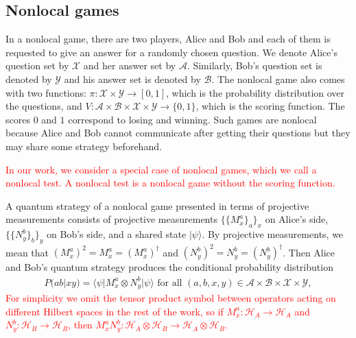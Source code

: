 \documentclass[11pt,letterpaper]{article}
\newcommand{\ket}[1]{|#1\rangle}
\newcommand{\bra}[1]{\langle#1|}
\newcommand{\x}{\otimes}
\newcommand{\calH}{\mathcal{H}}
\newcommand{\calX}{\mathcal{X}}
\newcommand{\calY}{\mathcal{Y}}
\newcommand{\calA}{\mathcal{A}}
\newcommand{\calB}{\mathcal{B}}
\newcommand{\1}{\mathbb{1}}
\newcommand{\pr}[2]{P(#1|#2)}
\newcommand{\hf}[1]{\textcolor{red}{#1}}
\theoremstyle{definition}
\begin{document}
\subsection{Nonlocal games}
In a nonlocal game, there are two players, Alice and Bob and each of them is requested
to give an answer for a randomly chosen question. We denote Alice's question set by $\calX$ and her answer set by $\calA$. Similarly,
Bob's question set is denoted by $\calY$ and his answer set is denoted by $\calB$. The nonlocal game also
comes with two functions: $\pi: \calX \times \calY \rightarrow [0,1]$, which is the probability distribution over the questions,
and $V: \calA \times \calB \times \calX \times \calY \rightarrow \{0,1\}$, which is the scoring function. 
The scores $0$ and $1$ correspond to losing and winning. 
Such games are nonlocal
because Alice and Bob cannot communicate after getting their questions but they may share some strategy beforehand. 

\hf{In our work, we consider a special case of nonlocal games, which we call a nonlocal test.
A nonlocal test is a nonlocal game without the scoring function.
}

A quantum strategy of a nonlocal game presented in terms of projective measurements
consists of projective measurements $\{\{M_x^a\}_a\}_x$ on Alice's side, 
$\{\{N_y^b\}_b\}_y$ on Bob's side, and a shared state $\ket{\psi}$. 
By projective measurements, we mean that  
$(M_x^a)^2 = M_x^a = (M_x^a)^\dagger$ and $(N_y^b)^2 = N_y^b = (N_y^b)^\dagger$.
Then Alice and Bob's quantum strategy produces the conditional probability distribution
\begin{align}
	\pr{ab}{xy} = \bra{\psi} M_x^a \x N_y^b \ket{\psi} \text{ for all } (a,b,x,y) \in \calA \times \calB \times \calX \times \calY,
\end{align}
\hf{For simplicity we omit the tensor product symbol between operators acting on different Hilbert spaces in the rest of the work, so if $M_x^a : \calH_A \rightarrow \calH_A$ and $N_y^b: 
\calH_B \rightarrow \calH_B$, then $M_x^a N_y^b: \calH_A\x \calH_B \rightarrow \calH_A \x \calH_B$.}
\end{document}
